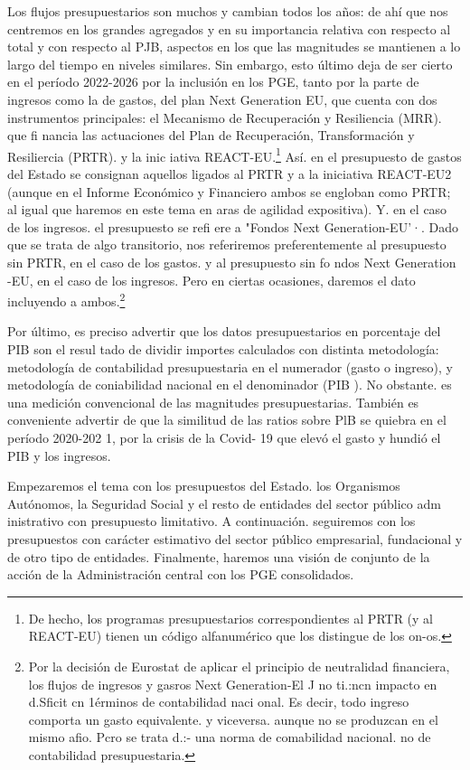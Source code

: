 \documentclass[10pt,a4paper]{article}
\begin{document}
Los flujos presupuestarios son muchos y cambian todos los años: de ahí que nos centremos en los grandes agregados y en su importancia relativa con respecto al total y con respecto al PJB, aspectos en los que las magnitudes se mantienen a lo largo del tiempo en niveles similares. Sin embargo, esto último deja de ser cierto en el período 2022-2026 por la inclusión en los PGE, tanto por la parte de ingresos como la de gastos, del plan Next Generation EU, que cuenta con dos instrumentos principales: el Mecanismo de Recuperación y Resiliencia (MRR). que fi nancia las actuaciones del Plan de Recuperación, Transformación y Resiliercia (PRTR). y la inic iativa REACT-EU.\footnote{%
    De hecho, los programas presupuestarios correspondientes al PRTR (y al REACT-EU) tienen un código alfanumérico que los distingue de los on-os.
} Así. en el presupuesto de gastos del Estado se consignan aquellos ligados al PRTR y a la iniciativa REACT-EU2 (aunque en el Informe Económico y Financiero ambos se engloban como PRTR; al igual que haremos en este tema en aras de agilidad expositiva). Y. en el caso de los ingresos. el presupuesto se refi ere a "Fondos Next Generation-EU'·. Dado que se trata de algo transitorio, nos referiremos preferentemente al presupuesto sin PRTR, en el caso de los gastos. y al presupuesto sin fo ndos Next Generation -EU, en el caso de los ingresos. Pero en ciertas ocasiones, daremos el dato incluyendo a ambos.\footnote{%
    Por la decisión de Eurostat de aplicar el principio de neutralidad financiera, los flujos de ingresos y gasros Next Generation-El J no ti.:ncn impacto en d.Sficit cn 1érminos de contabilidad naci onal. Es decir, todo ingreso comporta un gasto equivalente. y viceversa. aunque no se produzcan en el mismo afio. Pcro se trata d.:- una norma de comabilidad nacional. no de contabilidad presupuestaria.
}

Por último, es preciso advertir que los datos presupuestarios en porcentaje del PIB son el resul tado de dividir importes calculados con distinta metodología: metodología de contabilidad presupuestaria en el numerador (gasto o ingreso), y metodología de coniabilidad nacional en el denominador (PIB ). No obstante. es una medición convencional de las magnitudes presupuestarias. También es conveniente advertir de que la similitud de las ratios sobre PlB se quiebra en el período 2020-202 1, por la crisis de la Covid- 19 que elevó el gasto y hundió el PIB y los ingresos.

Empezaremos el tema con los presupuestos del Estado. los Organismos Autónomos, la Seguridad Social y el resto de entidades del sector público adm inistrativo con presupuesto limitativo. A continuación. seguiremos con los presupuestos con carácter estimativo del sector público empresarial, fundacional y de otro tipo de entidades. Finalmente, haremos una visión de conjunto de la acción de la Administración central con los PGE consolidados.
\end{document}
